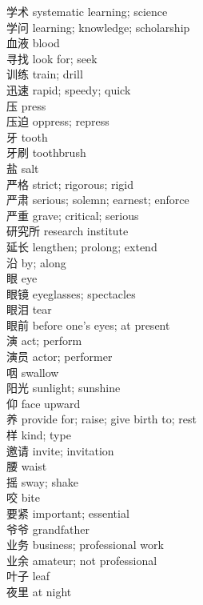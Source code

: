 学术 \quad systematic learning; science\\
学问 \quad learning; knowledge; scholarship\\
血液 \quad blood\\
寻找 \quad look for; seek\\
训练 \quad train; drill\\
迅速 \quad rapid; speedy; quick\\
压 \quad press\\
压迫 \quad oppress; repress\\
牙 \quad tooth\\
牙刷 \quad toothbrush\\
盐 \quad salt\\
严格 \quad strict; rigorous; rigid\\
严肃 \quad serious; solemn; earnest; enforce\\
严重 \quad grave; critical; serious\\
研究所 \quad research institute\\
延长 \quad lengthen; prolong; extend\\
沿 \quad by; along\\
眼 \quad eye\\
眼镜 \quad eyeglasses; spectacles\\
眼泪 \quad tear\\
眼前 \quad before one's eyes; at present\\
演 \quad act; perform\\
演员 \quad actor; performer\\
咽 \quad swallow\\
阳光 \quad sunlight; sunshine\\
仰 \quad face upward\\
养 \quad provide for; raise; give birth to; rest\\
样 \quad kind; type\\
邀请 \quad invite; invitation\\
腰 \quad waist\\
摇 \quad sway; shake\\
咬 \quad bite\\
要紧 \quad important; essential\\
爷爷 \quad grandfather\\
业务 \quad business; professional work\\
业余 \quad amateur; not professional\\
叶子 \quad leaf\\
夜里 \quad at night\\
